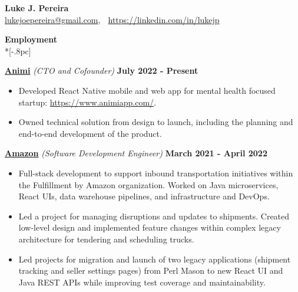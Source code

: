 \documentclass{article}
\begin{document}
\begin{center}
{\Large \bf Luke J. Pereira} \\[.5pc]
\href{mailto:lukejoepereira@gmail.com}{lukejoepereira@gmail.com}, $\;$
\href{https://linkedin.com/in/lukejp}{https://linkedin.com/in/lukejp}
\\[3pc]
\end{center}
\vspace{-25pt}

{\large \bf Employment} \\*[-.8pc]
\underline{\hspace{7in}}

{\bf{\underline{Animi}} } \textit{(CTO and Cofounder)} \hfill {\bf July 2022 - Present\/} 
\begin{itemize}[leftmargin=*]
    \itemsep0em
    \renewcommand\labelitemi{\tiny$\bullet$}
    \item Developed React Native mobile and web app for mental health focused startup: \url{https://www.animiapp.com/}.
    \item Owned technical solution from design to launch, including the planning and end-to-end development of the product.
\end{itemize}

{\bf{\underline{Amazon}} } \textit{(Software Development Engineer)} \hfill {\bf March 2021 - April 2022\/} 
\begin{itemize}[leftmargin=*]
    \itemsep0em
    \renewcommand\labelitemi{\tiny$\bullet$}
    \item Full-stack development to support inbound transportation initiatives within the Fulfillment by Amazon organization. Worked on Java microservices, React UIs, data warehouse pipelines, and infrastructure and DevOps.
    \item Led a project for managing disruptions and updates to shipments. Created low-level design and implemented feature changes within complex legacy architecture for tendering and scheduling trucks.
    \item Led projects for migration and launch of two legacy applications (shipment tracking and seller settings pages) from Perl Mason to new React UI and Java REST APIs while improving test coverage and maintainability.
\end{itemize}
\end{document}
